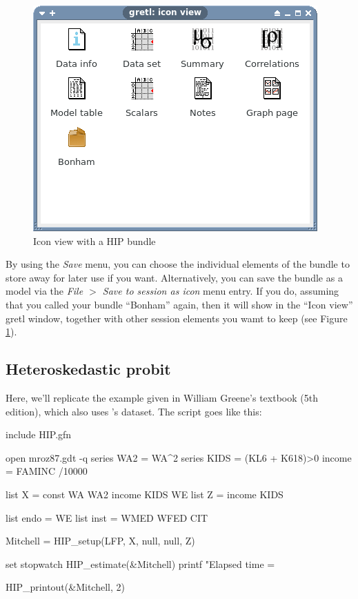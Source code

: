 \documentclass[a4paper,10pt]{article}
\newcounter{script}[section]
\begin{document}
\begin{figure}[htbp]
  \centering
  \includegraphics[scale=0.5]{HIP-sshot3.png}
  \caption{Icon view with a HIP bundle}
  \label{fig:iconview}
\end{figure}

By using the \emph{Save} menu, you can choose the individual
elements of the bundle to store away for later use if you
want. Alternatively, you can save the bundle as a model via the
\emph{File $>$ Save to session as icon} menu entry. If you do, assuming
that you called your bundle ``Bonham'' again, then it will show in the
``Icon view'' gretl window, together with other session elements you
wamt to keep (see Figure \ref{fig:iconview}).

\subsection{Heteroskedastic probit}

Here, we'll replicate the example given in William Greene's textbook
(5th edition), which also uses \citeauthor{Mroz87}'s dataset. The
script goes like this:

\begin{code}
include HIP.gfn

open mroz87.gdt -q
series WA2 = WA^2
series KIDS = (KL6 + K618)>0
income = FAMINC /10000

list X = const WA WA2 income KIDS WE
list Z = income KIDS

list endo = WE
list inst = WMED WFED CIT

Mitchell = HIP_setup(LFP, X, null, null, Z)

set stopwatch
HIP_estimate(&Mitchell)
printf "Elapsed time = %

HIP_printout(&Mitchell, 2)
\end{code}
\end{document}
